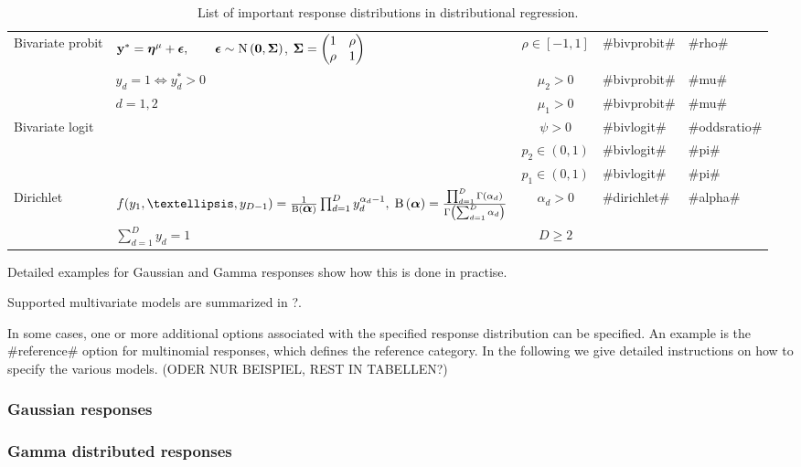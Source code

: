 \begin{table}
\begin{center}
\begin{tabular}{l l c l l}
Bivariate probit &$\mathbf{y}^\ast=\boldsymbol{\eta}^{\mu}+\mbox{\boldmath $\epsilon$}, \qquad \mbox{\boldmath $\epsilon$}\sim\mbox{N}\left(\boldsymbol{0},\mbox{\boldmath $\Sigma$}\right)$, 
$\mbox{\boldmath $\Sigma$} = \left(\begin{matrix}
1 & \rho\\
\rho& 1\\
\end{matrix}\right)$&$\rho\in[-1,1]$&#bivprobit#&#rho#\\
&$y_{d}=1 \Longleftrightarrow y_{d}^\ast	> 0$&$\mu_2>0$&#bivprobit#&#mu#\\
&$d=1,2$&$\mu_1>0$&#bivprobit#&#mu#\\\hline
Bivariate logit &&$\psi>0$&#bivlogit#&#oddsratio#\\
&&$p_2\in(0,1)$&#bivlogit#&#pi#\\
&&$p_1\in(0,1)$&#bivlogit#&#pi#\\	\hline
Dirichlet &$f(y_1,\ldots,y_{D-1}) = \frac{1}{\B(\alphavec)}\prod_{d=1}^{D}y_d^{\alpha_d-1},\;\B{(\alphavec)}=\frac{\prod_{d=1}^{D}\Gamma(\alpha_d)}{\Gamma\left(\sum_{d=1}^{D}\alpha_d\right)}$&$\alpha_d>0$&#dirichlet#&#alpha#\\	
&$\sum_{d=1}^D y_d = 1$&$D\geq 2$&&\\
\hline\hline
\end{tabular}
\end{center}\caption{\footnotesize List of important response distributions in distributional regression.}\label{tab:distrBayesX4}
\end{table}


Detailed examples for Gaussian and Gamma responses
show how this is done in practise.




Supported
multivariate models are summarized in ?.

In some cases, one or more additional
options associated with the specified response distribution can be
specified. An example is the #reference# option for multinomial
responses, which defines the reference category. In the following
we give detailed instructions on how to specify the various
models. (ODER NUR BEISPIEL, REST IN TABELLEN?)

\subsubsection*{Gaussian responses}


\subsubsection*{Gamma distributed responses}







